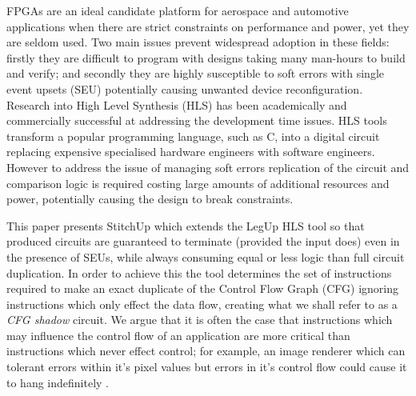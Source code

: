 





FPGAs are an ideal candidate platform for aerospace and automotive applications
when there are strict constraints on performance and power, yet they are seldom used.
Two main issues prevent widespread adoption in these fields: firstly they are difficult
to program with designs taking many man-hours to build and verify;
and secondly they are highly susceptible to soft errors with single event upsets (SEU)
potentially causing unwanted device reconfiguration.
Research into High Level Synthesis (HLS) has been academically and commercially successful
at addressing the development time issues. HLS tools transform a popular programming language, such as C,
into a digital circuit replacing expensive specialised hardware engineers with software engineers.
However to address the issue of managing soft errors replication of the circuit and comparison logic is required
costing large amounts of additional resources and power, potentially causing the design to break constraints.

This paper presents StitchUp which extends the LegUp HLS tool \cite{canis2011legup} so that produced circuits are
guaranteed to terminate (provided the input does) even in the presence of SEUs, while always consuming equal or less logic than full circuit duplication.
In order to achieve this the tool determines the set of instructions required to make an exact duplicate of the Control
Flow Graph (CFG) ignoring instructions which only effect the data flow, creating what we shall refer to as a \emph{CFG shadow} circuit.
We argue that it is often the case that instructions which may influence the control flow of an application are more critical
than instructions which never effect control; for example, an image renderer which can tolerant errors within
it's pixel values but errors in it's control flow could cause it to hang indefinitely \cite{sampson2011enerj}.


